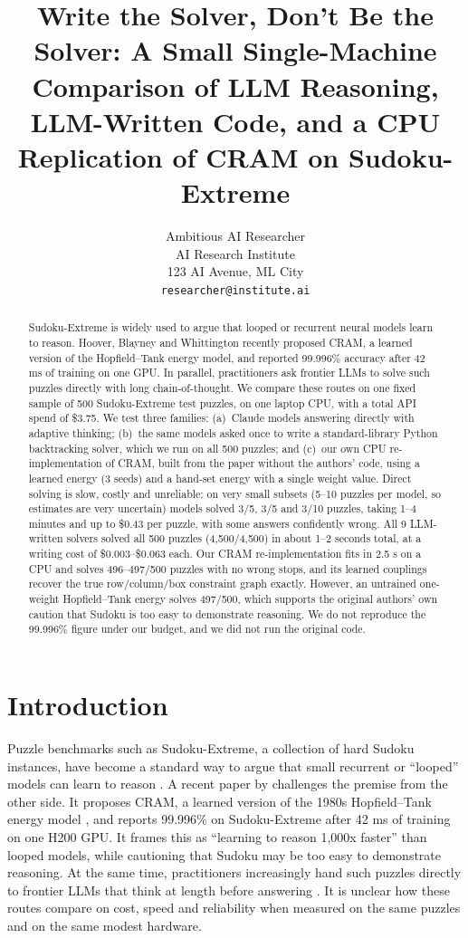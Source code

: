 \documentclass{article} %
\title{Write the Solver, Don't Be the Solver: A Small Single-Machine Comparison of LLM Reasoning, LLM-Written Code, and a CPU Replication of CRAM on Sudoku-Extreme}
\author{Ambitious AI Researcher\\
AI Research Institute\\
123 AI Avenue, ML City\\
\texttt{researcher@institute.ai}
}
\begin{document}
\maketitle

\begin{abstract}
Sudoku-Extreme is widely used to argue that looped or recurrent neural models learn to reason. Hoover, Blayney and Whittington recently proposed CRAM, a learned version of the Hopfield--Tank energy model, and reported 99.996\% accuracy after 42 ms of training on one GPU. In parallel, practitioners ask frontier LLMs to solve such puzzles directly with long chain-of-thought. We compare these routes on one fixed sample of 500 Sudoku-Extreme test puzzles, on one laptop CPU, with a total API spend of \$3.75. We test three families: (a)~Claude models answering directly with adaptive thinking; (b)~the same models asked once to write a standard-library Python backtracking solver, which we run on all 500 puzzles; and (c)~our own CPU re-implementation of CRAM, built from the paper without the authors' code, using a learned energy (3 seeds) and a hand-set energy with a single weight value. Direct solving is slow, costly and unreliable: on very small subsets (5--10 puzzles per model, so estimates are very uncertain) models solved 3/5, 3/5 and 3/10 puzzles, taking 1--4 minutes and up to \$0.43 per puzzle, with some answers confidently wrong. All 9 LLM-written solvers solved all 500 puzzles (4,500/4,500) in about 1--2 seconds total, at a writing cost of \$0.003--\$0.063 each. Our CRAM re-implementation fits in 2.5 s on a CPU and solves 496--497/500 puzzles with no wrong stops, and its learned couplings recover the true row/column/box constraint graph exactly. However, an untrained one-weight Hopfield--Tank energy solves 497/500, which supports the original authors' own caution that Sudoku is too easy to demonstrate reasoning. We do not reproduce the 99.996\% figure under our budget, and we did not run the original code.
\end{abstract}

\section{Introduction}
\label{sec:intro}
Puzzle benchmarks such as Sudoku-Extreme, a collection of hard Sudoku instances, have become a standard way to argue that small recurrent or ``looped'' models can learn to reason \citep{wang2025hrm,jolicoeur2025trm}. A recent paper by \citet{hoover2026cram} challenges the premise from the other side. It proposes CRAM, a learned version of the 1980s Hopfield--Tank energy model \citep{hopfield1985neural}, and reports 99.996\% on Sudoku-Extreme after 42 ms of training on one H200 GPU. It frames this as ``learning to reason 1,000x faster'' than looped models, while cautioning that Sudoku may be too easy to demonstrate reasoning. At the same time, practitioners increasingly hand such puzzles directly to frontier LLMs that think at length before answering \citep{wei2022cot}. It is unclear how these routes compare on cost, speed and reliability when measured on the same puzzles and on the same modest hardware.
\end{document}
